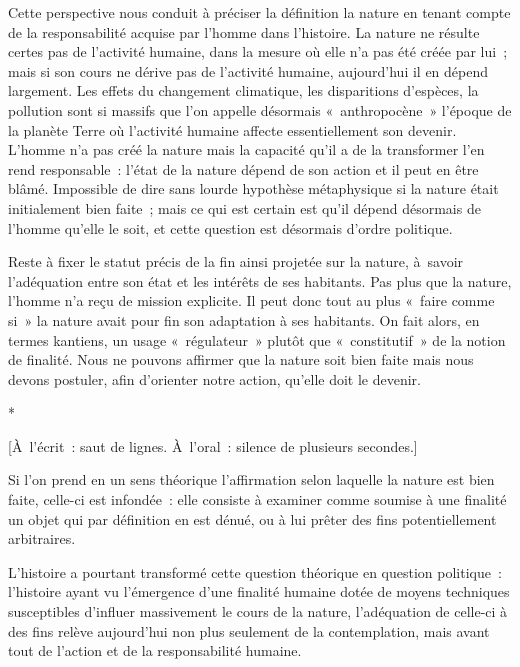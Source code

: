\documentclass[a4paper,12pt]{report}
\begin{document}
Cette perspective nous conduit à préciser la
définition la nature en tenant compte de la responsabilité acquise par
l'homme dans l'histoire. La nature ne résulte
certes pas de l'activité humaine, dans la mesure où elle n'a pas été
créée par lui ; mais si son cours ne dérive pas de l'activité humaine,
aujourd'hui il en dépend largement. Les effets du changement climatique,
les disparitions d'espèces, la pollution sont si massifs que l'on
appelle désormais « anthropocène » l'époque de la planète Terre où
l'activité humaine affecte essentiellement son devenir. L'homme n'a pas
créé la nature mais la capacité qu'il a de la transformer l'en rend
responsable : l'état de la nature dépend de son action et il peut en
être blâmé. Impossible de dire sans lourde hypothèse métaphysique si la
nature était initialement bien faite ; mais ce qui est
certain est qu'il dépend désormais de
l'homme qu'elle le soit, et cette question est désormais d'ordre
politique.

Reste à fixer le statut précis de la fin ainsi
projetée sur la nature, à savoir l'adéquation entre son état et les
intérêts de ses habitants. Pas plus que la nature, l'homme n'a reçu de
mission explicite. Il peut donc tout au plus « faire comme si » la
nature avait pour fin son adaptation à ses habitants. On fait alors, en
termes kantiens, un usage « régulateur » plutôt que
« constitutif » de la notion de finalité. Nous ne
pouvons affirmer que la nature soit bien
faite mais nous devons postuler, afin d'orienter notre action, qu'elle
doit le devenir.

\begin{center}
*

[À l'écrit : saut de lignes. À l'oral : silence de plusieurs secondes.]
\end{center}


Si l'on prend en un sens théorique l'affirmation
selon laquelle la nature est bien faite, celle-ci est infondée : elle
consiste à examiner comme soumise à une finalité un objet qui par
définition en est dénué, ou à lui prêter des fins potentiellement
arbitraires.

L'histoire a pourtant transformé cette question théorique en question
politique : l'histoire ayant vu l'émergence d'une finalité humaine dotée
de moyens techniques susceptibles d'influer massivement le cours de la
nature, l'adéquation de celle-ci à des fins relève aujourd'hui non plus
seulement de la contemplation, mais avant tout de l'action et de la
responsabilité humaine.
\end{document}
